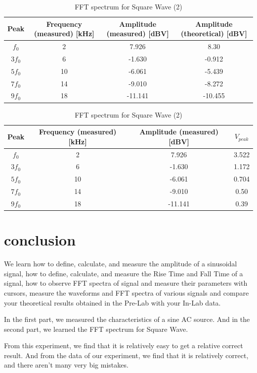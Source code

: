 \documentclass{article}
\begin{document}
	\begin{table}[H]
		\centering
	\begin{tabular}{|c|c|c|c|}
		\hline 
		Peak& Frequency (measured) [kHz] & Amplitude (measured) [dBV] &Amplitude (theoretical) [dBV]\\ 
		\hline 
		$f_0$& 2 & 7.926 &8.30\\ 
		\hline 
		$3f_0$& 6 & -1.630 &-0.912\\ 
		\hline 
		$5f_0$& 10 & -6.061 &-5.439\\ 
		\hline 
		$7f_0$& 14 & -9.010 &-8.272\\ 
		\hline 
		$9f_0$& 18 & -11.141 &-10.455\\ 
		\hline 
	\end{tabular} 
	\caption{FFT spectrum for Square Wave (2)}
\end{table}
\begin{table}[H]
	\centering
	\begin{tabular}{|c|c|c|c|}
		\hline 
		Peak& Frequency (measured) [kHz] & Amplitude (measured) [dBV] &$V_{peak}$\\ 
		\hline 
		$f_0$& 2 & 7.926 &3.522\\ 
		\hline 
		$3f_0$& 6 & -1.630 &1.172\\ 
		\hline 
		$5f_0$& 10 & -6.061 &0.704\\ 
		\hline 
		$7f_0$& 14 & -9.010 &0.50\\ 
		\hline 
		$9f_0$& 18 & -11.141 &0.39\\ 
		\hline 
	\end{tabular} 
	\caption{FFT spectrum for Square Wave (2)}
\end{table}
\section{conclusion}


We learn  how to define, calculate, and measure the amplitude of a sinusoidal
signal,  how to define, calculate, and measure the Rise Time and Fall Time of a
signal, how to observe FFT spectra of signal and measure their parameters with
cursors, measure the waveforms and FFT spectra of various signals and compare your theoretical results obtained in the Pre-Lab with your In-Lab
data.

In the first part, we measured the characteristics of a sine AC source. And in the second part, we learned the FFT spectrum for Square Wave.

From this experiment, we find that it is relatively easy to get a relative correct result. And from the data of our experiment, we find that it is relatively correct, and there aren't many very big mistakes. 
\end{document}

